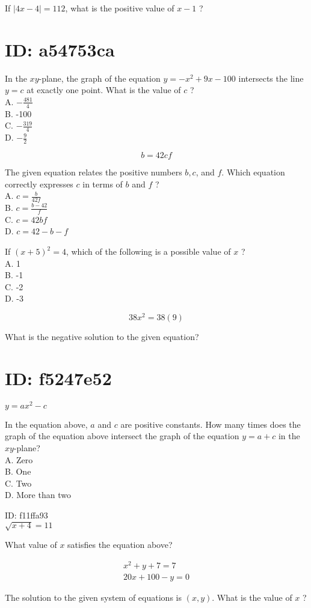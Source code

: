 If $|4 x-4|=112$, what is the positive value of $x-1$ ?

\section*{ID: a54753ca}
In the $x y$-plane, the graph of the equation $y=-x^{2}+9 x-100$ intersects the line $y=c$ at exactly one point. What is the value of $c$ ?\\
A. $-\frac{481}{4}$\\
B. -100\\
C. $-\frac{319}{4}$\\
D. $-\frac{9}{2}$

$$
b=42 c f
$$

The given equation relates the positive numbers $b, c$, and $f$. Which equation correctly expresses $c$ in terms of $b$ and $f$ ?\\
A. $c=\frac{b}{42 f}$\\
B. $c=\frac{b-42}{f}$\\
C. $c=42 b f$\\
D. $c=42-b-f$

If $(x+5)^{2}=4$, which of the following is a possible value of $x$ ?\\
A. 1\\
B. -1\\
C. -2\\
D. -3

$$
38 x^{2}=38(9)
$$

What is the negative solution to the given equation?

\section*{ID: f5247e52}
$y=a x^{2}-c$

In the equation above, $a$ and $c$ are positive constants. How many times does the graph of the equation above intersect the graph of the equation $y=a+c$ in the $x y$-plane?\\
A. Zero\\
B. One\\
C. Two\\
D. More than two

ID: f11ffa93\\
$\sqrt{x+4}=11$

What value of $x$ satisfies the equation above?

$$
\begin{gathered}
x^{2}+y+7=7 \\
20 x+100-y=0
\end{gathered}
$$

The solution to the given system of equations is $(x, y)$. What is the value of $x$ ?


